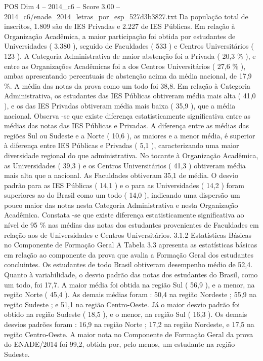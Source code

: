 \begin{textsample}{POS Dim 4 – 2014\_c6 – Score 3.00 – 2014\_c6/enade\_2014\_letras\_por\_esp\_527d3b3827.txt}
Da população total de inscritos, 1.809 são de IES Privadas e 2.227 de IES Públicas.
Em relação à Organização Acadêmica, a maior participação foi obtida por estudantes de Universidades ( 3.380 ), seguido de Faculdades ( 533 ) e Centros Universitários ( 123 ).
A Categoria Administrativa de maior abstenção foi a Privada ( 20,3 \% ), e entre as Organizações Acadêmicas foi a dos Centros Universitários ( 27,6 \% ), ambas apresentando percentuais de abstenção acima da média nacional, de 17,9 \%.
A média das notas da prova como um todo foi 38,8.
Em relação à Categoria Administrativa, os estudantes das IES Públicas obtiveram média mais alta ( 41,0 ), e os das IES Privadas obtiveram média mais baixa ( 35,9 ), que a média nacional.
Observa -se que existe diferença estatisticamente significativa entre as médias das notas das IES Públicas e Privadas.
A diferença entre as médias das regiões Sul ou Sudeste e a Norte ( 10,6 ), as maiores e a menor média, é superior à diferença entre IES Públicas e Privadas ( 5,1 ), caracterizando uma maior diversidade regional do que administrativa.
No tocante à Organização Acadêmica, as Universidades ( 39,3 ) e os Centros Universitários ( 41,3 ) obtiveram média mais alta que a nacional.
As Faculdades obtiveram 35,1 de média.
O desvio padrão para as IES Públicas ( 14,1 ) e o para as Universidades ( 14,2 ) foram superiores ao do Brasil como um todo ( 14,0 ), indicando uma dispersão um pouco maior das notas nesta Categoria Administrativa e nesta Organização Acadêmica.
Constata -se que existe diferença estatisticamente significativa ao nível de 95 \% nas médias das notas dos estudantes provenientes de Faculdades em relação aos de Universidades e Centros Universitários. 3.1.2 Estatísticas Básicas no Componente de Formação Geral A Tabela 3.3 apresenta as estatísticas básicas em relação ao componente da prova que avalia a Formação Geral dos estudantes concluintes.
Os estudantes de todo Brasil obtiveram desempenho médio de 52,4.
Quanto à variabilidade, o desvio padrão das notas dos estudantes do Brasil, como um todo, foi 17,7.
A maior média foi obtida na região Sul ( 56,9 ), e a menor, na região Norte ( 45,4 ).
As demais médias foram : 50,4 na região Nordeste ; 55,9 na região Sudeste ; e 51,1 na região Centro-Oeste.
Já o maior desvio padrão foi obtido na região Sudeste ( 18,5 ), e o menor, na região Sul ( 16,3 ).
Os demais desvios padrões foram : 16,9 na região Norte ; 17,2 na região Nordeste, e 17,5 na região Centro-Oeste.
A maior nota no Componente de Formação Geral da prova do ENADE/2014 foi 99,2, obtida por, pelo menos, um estudante na região Sudeste.

\end{textsample}
